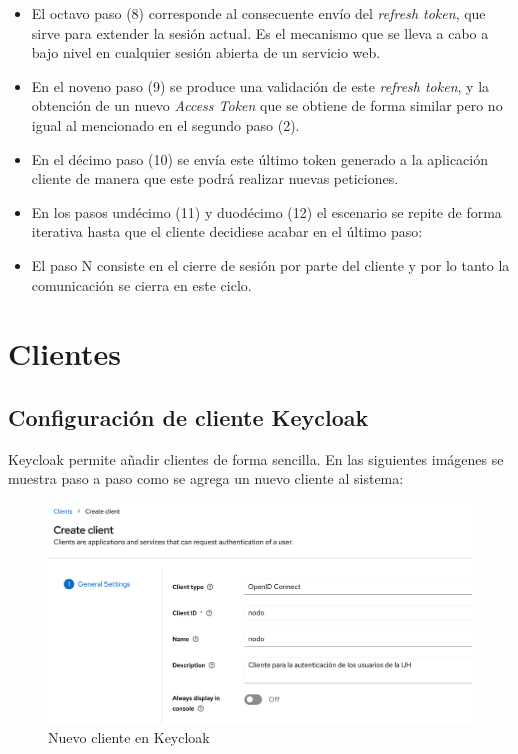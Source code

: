 \begin{itemize}
	\item El octavo paso (8) corresponde al consecuente envío del \textit{refresh token}, que sirve para extender la sesión actual. Es el mecanismo que se lleva a cabo a bajo nivel en cualquier sesión abierta de un servicio web.
	
	\item En el noveno paso (9) se produce una validación de este \textit{refresh token}, y la obtención de un nuevo \textit{Access Token} que se obtiene de forma similar pero no igual al mencionado en el segundo paso (2). 
	
	\item En el décimo paso (10) se envía este último token generado a la aplicación cliente de manera que este podrá realizar nuevas peticiones. 
	
	\item En los pasos undécimo (11) y duodécimo (12) el escenario se repite de forma
	iterativa hasta que el cliente decidiese acabar en el último paso: 
	
	\item El paso N consiste en el cierre de sesión por parte del cliente y por lo tanto la comunicación se cierra en este ciclo. 
	
\end{itemize}


\section*{Clientes}

\subsection*{Configuración de cliente Keycloak}

Keycloak permite añadir clientes de forma sencilla. En las siguientes imágenes se muestra paso a paso como se agrega un nuevo cliente al sistema:

\begin{figure}[H]
	\centering
	\includegraphics[width=1\linewidth]{Graphics/client_new1}
	\caption{Nuevo cliente en Keycloak}
	\label{fig:clientnew1}
\end{figure}

